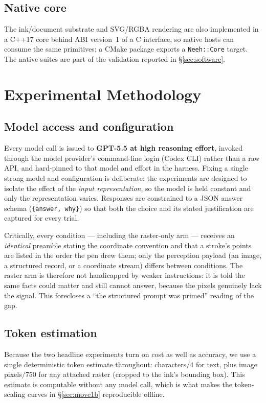 \documentclass[11pt]{article}
\newcommand{\code}[1]{\texttt{#1}}
\begin{document}
\subsection{Native core}
The ink/document substrate and SVG/RGBA rendering are also implemented in a
C++17 core behind ABI version~1 of a C interface, so native hosts can consume the
same primitives; a CMake package exports a \code{Neeh::Core} target. The native
suites are part of the validation reported in \S\ref{sec:software}.

\section{Experimental Methodology}
\label{sec:method}

\subsection{Model access and configuration}
Every model call is issued to \textbf{GPT-5.5 at high reasoning effort},
invoked through the model provider's command-line login (Codex CLI) rather than
a raw API, and hard-pinned to that model and effort in the harness. Fixing a
single strong model and configuration is deliberate: the experiments are designed
to isolate the effect of the \emph{input representation}, so the model is held
constant and only the representation varies. Responses are constrained to a JSON
answer schema (\code{\{answer, why\}}) so that both the choice and its stated
justification are captured for every trial.

Critically, every condition --- including the raster-only arm --- receives an
\emph{identical} preamble stating the coordinate convention and that a stroke's
points are listed in the order the pen drew them; only the perception payload
(an image, a structured record, or a coordinate stream) differs between
conditions. The raster arm is therefore not handicapped by weaker instructions:
it is told the same facts could matter and still cannot answer, because the
pixels genuinely lack the signal. This forecloses a ``the structured prompt was
primed'' reading of the gap.

\subsection{Token estimation}
Because the two headline experiments turn on cost as well as accuracy, we use a
single deterministic token estimate throughout: characters$/4$ for text, plus
image pixels$/750$ for any attached raster (cropped to the ink's bounding box).
This estimate is computable without any model call, which is what makes the
token-scaling curves in \S\ref{sec:move1b} reproducible offline.
\end{document}
